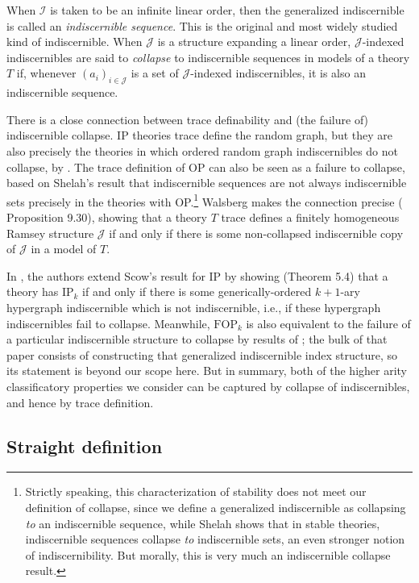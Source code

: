 \documentclass[10pt,a4paper]{amsart}
\newcommand{\calI}{\mathcal{I}}
\newcommand{\calJ}{\mathcal{J}}
\begin{document}
When $\calI$ is taken to be an infinite linear order, then the generalized indiscernible is called an \textit{indiscernible sequence}. This is the original and most widely studied kind of indiscernible. When $\calJ$ is a structure expanding a linear order, $\calJ$-indexed indiscernibles are said to \textit{collapse} to indiscernible sequences in models of a theory $T$ if, whenever $(a_i)_{i\in\calJ}$ is a set of $\calJ$-indexed indiscernibles, it is also an indiscernible sequence.

There is a close connection between trace definability and (the failure of) indiscernible collapse. IP theories trace define the random graph, but they are also precisely the theories in which ordered random graph indiscernibles do not collapse, by \cite{scow2012characterization}. The trace definition of OP can also be seen as a failure to collapse, based on Shelah's result that indiscernible sequences are not always indiscernible sets precisely in the theories with OP.\footnote{Strictly speaking, this characterization of stability does not meet our definition of collapse, since we define a generalized indiscernible as collapsing \textit{to} an indiscernible sequence, while Shelah shows that in stable theories, indiscernible sequences collapse \textit{to} indiscernible sets, an even stronger notion of indiscernibility. But morally, this is very much an indiscernible collapse result.} Walsberg makes the connection precise (\cite{walsberg2025trace} Proposition 9.30), showing that a theory $T$ trace defines a finitely homogeneous Ramsey structure $\calJ$ if and only if there is some non-collapsed indiscernible copy of $\calJ$ in a model of $T$.

In \cite{chernikov2019n}, the authors extend Scow's result for IP by showing (Theorem 5.4) that a theory has $\text{IP}_k$ if and only if there is some generically-ordered $k+1$-ary hypergraph indiscernible which is not indiscernible, i.e., if these hypergraph indiscernibles fail to collapse. Meanwhile, $\text{FOP}_k$ is also equivalent to the failure of a particular indiscernible structure to collapse by results of \cite{abd2025higher}; the bulk of that paper consists of constructing that generalized indiscernible index structure, so its statement is beyond our scope here. But in summary, both of the higher arity classificatory properties we consider can be captured by collapse of indiscernibles, and hence by trace definition.



\subsection{Straight definition}\label{straight definition section}
\end{document}
